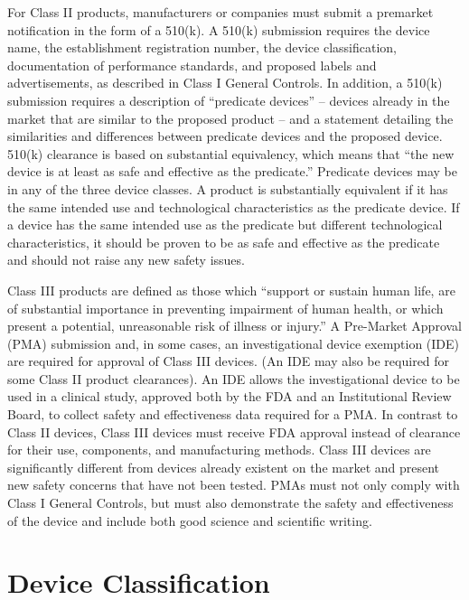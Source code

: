 \documentclass{article}
\begin{document}
For Class II products, manufacturers or companies must submit a premarket notification in the form of a 510(k). A 510(k) submission requires the device name, the establishment registration number, the device classification, documentation of performance standards, and proposed labels and advertisements, as described in Class I General Controls. In addition, a 510(k) submission requires a description of “predicate devices” – devices already in the market that are similar to the proposed product – and a statement detailing the similarities and differences between predicate devices and the proposed device. 510(k) clearance is based on substantial equivalency, which means that “the new device is at least as safe and effective as the predicate.” Predicate devices may be in any of the three device classes. A product is substantially equivalent if it has the same intended use  and technological characteristics as the predicate device. If a device has the same intended use as the predicate but different technological characteristics, it should be proven to be as safe and effective as the predicate and should not raise any new safety issues. 

Class III products are defined as those which “support or sustain human life, are of substantial importance in preventing impairment of human health, or which present a potential, unreasonable risk of illness or injury.” A Pre-Market Approval (PMA) submission and, in some cases, an investigational device exemption (IDE) are required for approval of Class III devices. (An IDE may also be required for some Class II product clearances). An IDE allows the investigational device to be used in a clinical study, approved both by the FDA and an Institutional Review Board, to collect safety and effectiveness data required for a PMA. 
In contrast to Class II devices, Class III devices must receive FDA approval instead of clearance for their use, components, and manufacturing methods. Class III devices are significantly different from devices already existent on the market and present new safety concerns that have not been tested. PMAs must not only comply with Class I General Controls, but must also demonstrate the safety and effectiveness of the device and include both good science and scientific writing. 

	 

\section{Device Classification}
\label{sec:protocols}
\end{document}
